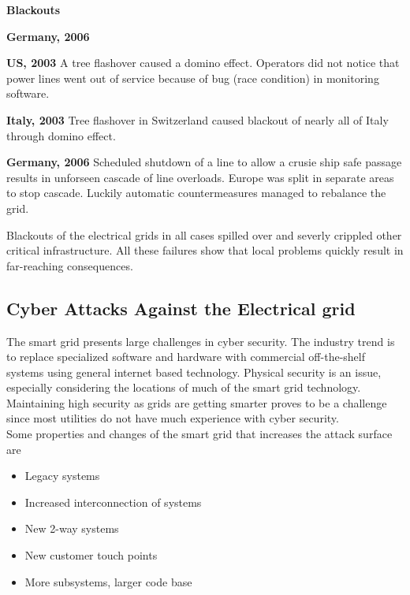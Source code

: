\begin{tcolorbox}
    \textbf{Blackouts}
    \begin{labeling}{\textbf{Germany, 2006}}
    \item [\textbf{US, 2003}]
        A tree flashover caused a domino effect.
        Operators did not notice that power lines went out of service because of bug (race condition) in monitoring software.
    \item [\textbf{Italy, 2003}]
        Tree flashover in Switzerland caused blackout of nearly all of Italy through domino effect.
    \item [\textbf{Germany, 2006}]
    Scheduled shutdown of a line to allow a crusie ship safe passage results in unforseen cascade of line overloads.
        Europe was split in separate areas to stop cascade.
        Luckily automatic countermeasures managed to rebalance the grid.
    \end{labeling}

Blackouts of the electrical grids in all cases spilled over and severly crippled other critical infrastructure.
All these failures show that local problems quickly result in far-reaching consequences.
\end{tcolorbox}

\subsection{Cyber Attacks Against the Electrical grid}
The smart grid presents large challenges in cyber security.
The industry trend is to replace specialized software and hardware with commercial off-the-shelf systems using general internet based technology.
Physical security is an issue, especially considering the locations of much of the smart grid technology.
Maintaining high security as grids are getting smarter proves to be a challenge since most utilities do not have much experience with cyber security.\\

Some properties and changes of the smart grid that increases the attack surface are
\begin{itemize}
    \item Legacy systems
    \item Increased interconnection of systems
    \item New 2-way systems
    \item New customer touch points
    \item More subsystems, larger code base
\end{itemize}

